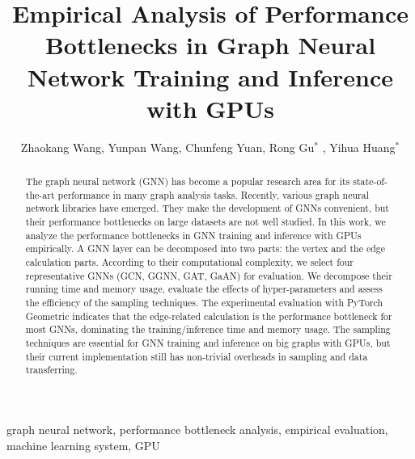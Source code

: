 \documentclass{elsarticle}
\begin{document}
\begin{frontmatter}

	\title{Empirical Analysis of Performance Bottlenecks in Graph Neural Network Training and Inference with GPUs}
    \author{Zhaokang Wang, Yunpan Wang, Chunfeng Yuan, Rong Gu$^*$ , Yihua Huang$^*$ }
	\address{State Key Laboratory for Novel Software Technology, \\Department of Computer Science and Technology, Nanjing University, \\Nanjing 210023, China}

	\begin{abstract}
		The graph neural network (GNN) has become a popular research area for its state-of-the-art performance in many graph analysis tasks.
		Recently, various graph neural network libraries have emerged.
        They make the development of GNNs convenient, but their performance bottlenecks on large datasets are not well studied.
		In this work, we analyze the performance bottlenecks in GNN training and inference with GPUs empirically.
		A GNN layer can be decomposed into two parts: the vertex and the edge calculation parts.
		According to their computational complexity, we select four representative GNNs (GCN, GGNN, GAT, GaAN) for evaluation.
		We decompose their running time and memory usage, evaluate the effects of hyper-parameters and assess the efficiency of the sampling techniques.
		The experimental evaluation with PyTorch Geometric indicates that the edge-related calculation is the performance bottleneck for most GNNs, dominating the training/inference time and memory usage.
        The sampling techniques are essential for GNN training and inference on big graphs with GPUs, but their current implementation still has non-trivial overheads in sampling and data transferring.
	\end{abstract}

	\begin{keyword}
		graph neural network, performance bottleneck analysis, empirical evaluation, machine learning system, GPU
	\end{keyword}

\end{frontmatter}

\linenumbers










\end{document}
